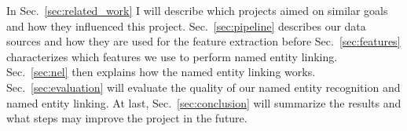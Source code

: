In Sec.~\ref{sec:related_work} I will describe which projects aimed on similar goals and how they influenced this project. Sec.~\ref{sec:pipeline} describes our data sources and how they are used for the feature extraction before Sec.~\ref{sec:features} characterizes which features we use to perform named entity linking. Sec.~\ref{sec:nel} then explains how the named entity linking works. Sec.~\ref{sec:evaluation} will evaluate the quality of our named entity recognition and named entity linking. At last, Sec.~\ref{sec:conclusion} will summarize the results and what steps may improve the project in the future.
